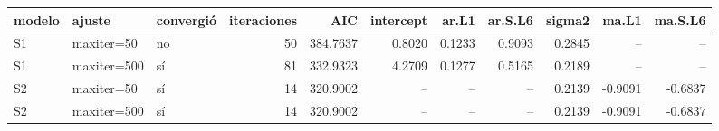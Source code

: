 \begin{tabular}{lllrrrrrrrr}
\toprule
modelo & ajuste & convergió & iteraciones & AIC & intercept & ar.L1 & ar.S.L6 & sigma2 & ma.L1 & ma.S.L6 \\
\midrule
S1 & maxiter=50 & no & 50 & 384.7637 & 0.8020 & 0.1233 & 0.9093 & 0.2845 & -- & -- \\
S1 & maxiter=500 & sí & 81 & 332.9323 & 4.2709 & 0.1277 & 0.5165 & 0.2189 & -- & -- \\
S2 & maxiter=50 & sí & 14 & 320.9002 & -- & -- & -- & 0.2139 & -0.9091 & -0.6837 \\
S2 & maxiter=500 & sí & 14 & 320.9002 & -- & -- & -- & 0.2139 & -0.9091 & -0.6837 \\
\bottomrule
\end{tabular}
